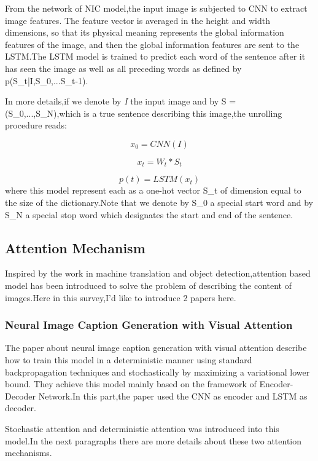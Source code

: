 \documentclass[xelatex,a4j,10pt,twocolumn]{article}
\begin{document}
From the network of NIC model,the input image is subjected to CNN to extract image features. The feature vector is averaged in the height and width dimensions, so that its physical meaning represents the global information features of the image, and then the global information features are sent to the LSTM.The LSTM model \cite{8LSTM}is trained to predict each word of the sentence after it has seen the image as well as all preceding words as defined by  p(S\_t|I,S\_0,...S\_t-1).

In more details,if we denote by \textit{I} the input image and by S = (S\_0,...,S\_N),which is a true sentence describing this image,the unrolling procedure reads:

\begin{equation}
x_0 = CNN(I)
\end{equation}

\begin{equation}
x_t = W_t*S_t    
\end{equation}

\begin{equation}
p(t)=LSTM(x_t)
\end{equation}
where this model represent each as a one-hot vector S\_t of dimension equal to the size of the dictionary.Note that we denote by S\_0 a special start word and by S\_N a special stop word which designates the start and end of the sentence.

\subsection{Attention Mechanism}
Inspired by the work in machine translation and object detection,attention based model has been introduced to solve the problem of describing the content of images.Here in this survey,I'd like to introduce 2 papers here.
\subsubsection{Neural Image Caption Generation with Visual Attention}
The paper\cite{2DBLP} about neural image caption generation with visual attention describe how to train this model in a deterministic manner using standard backpropagation techniques and stochastically by maximizing a variational lower bound.
They achieve this model mainly based on the framework of Encoder-Decoder Network.In this part,the paper used the CNN as encoder and LSTM as decoder.

Stochastic attention and deterministic attention was introduced into this model.In the next paragraphs there are more details about these two attention mechanisms.
\end{document}
